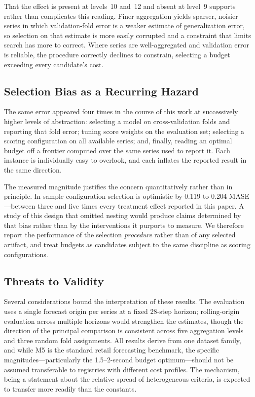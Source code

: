 That the effect is present at levels~10 and~12 and absent at level~9 supports rather than complicates this reading. Finer aggregation yields sparser, noisier series in which validation-fold error is a weaker estimate of generalization error, so selection on that estimate is more easily corrupted and a constraint that limits search has more to correct. Where series are well-aggregated and validation error is reliable, the procedure correctly declines to constrain, selecting a budget exceeding every candidate's cost.

\subsection{Selection Bias as a Recurring Hazard}
The same error appeared four times in the course of this work at successively higher levels of abstraction: selecting a model on cross-validation folds and reporting that fold error; tuning score weights on the evaluation set; selecting a scoring configuration on all available series; and, finally, reading an optimal budget off a frontier computed over the same series used to report it. Each instance is individually easy to overlook, and each inflates the reported result in the same direction.

The measured magnitude justifies the concern quantitatively rather than in principle. In-sample configuration selection is optimistic by 0.119 to 0.204 MASE---between three and five times every treatment effect reported in this paper. A study of this design that omitted nesting would produce claims determined by that bias rather than by the interventions it purports to measure. We therefore report the performance of the selection \emph{procedure} rather than of any selected artifact, and treat budgets as candidates subject to the same discipline as scoring configurations.

\subsection{Threats to Validity}
Several considerations bound the interpretation of these results. The evaluation uses a single forecast origin per series at a fixed 28-step horizon; rolling-origin evaluation across multiple horizons would strengthen the estimates, though the direction of the principal comparison is consistent across five aggregation levels and three random fold assignments. All results derive from one dataset family, and while M5 is the standard retail forecasting benchmark, the specific magnitudes---particularly the 1.5--2-second budget optimum---should not be assumed transferable to registries with different cost profiles. The mechanism, being a statement about the relative spread of heterogeneous criteria, is expected to transfer more readily than the constants.

